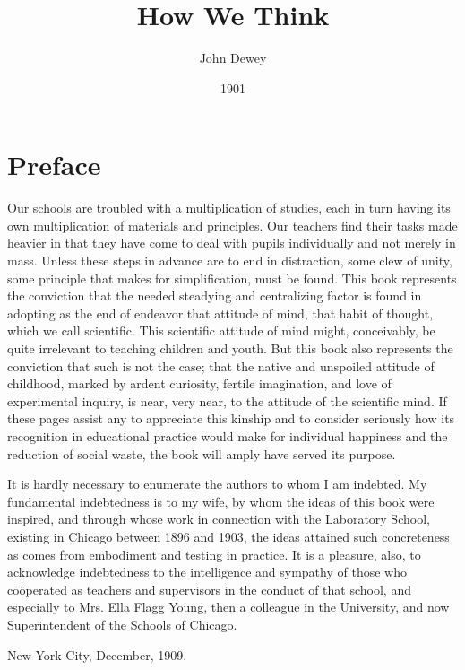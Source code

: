 \documentclass[letterpaper]{book}
\title{How We Think}
\author{John Dewey}
\date{1901}
\begin{document}
\frontmatter
\maketitle
\pagestyle{plain}

\chapter{Preface}

Our schools are troubled with a multiplication of studies, each in turn
having its own multiplication of materials and principles. Our teachers
find their tasks made heavier in that they have come to deal with pupils
individually and not merely in mass. Unless these steps in advance are
to end in distraction, some clew of unity, some principle that makes for
simplification, must be found. This book represents the conviction that
the needed steadying and centralizing factor is found in adopting as the
end of endeavor that attitude of mind, that habit of thought, which we
call scientific. This scientific attitude of mind might, conceivably, be
quite irrelevant to teaching children and youth. But this book also
represents the conviction that such is not the case; that the native and
unspoiled attitude of childhood, marked by ardent curiosity, fertile
imagination, and love of experimental inquiry, is near, very near, to
the attitude of the scientific mind. If these pages assist any to
appreciate this kinship and to consider seriously how its recognition in
educational practice would make for individual happiness and the
reduction of social waste, the book will amply have served its purpose.

It is hardly necessary to enumerate the authors to whom I am indebted.
My fundamental indebtedness is to my wife, by whom the ideas of this
book were inspired, and through whose work in connection with the
Laboratory School, existing in Chicago between 1896 and 1903, the ideas
attained such concreteness as comes from embodiment and testing in
practice. It is a pleasure, also, to acknowledge indebtedness to the
intelligence and sympathy of those who coöperated as teachers and
supervisors in the conduct of that school, and especially to Mrs. Ella
Flagg Young, then a colleague in the University, and now Superintendent
of the Schools of Chicago.

{New York City}, December, 1909.

\setcounter{tocdepth}{2}
\tableofcontents

\mainmatter
\end{document}
